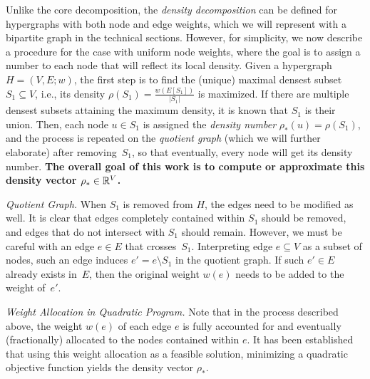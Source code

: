 Unlike the core decomposition, the \emph{density decomposition}
can be defined for hypergraphs with both node and edge weights,
which we will represent with a bipartite graph in the technical sections.
However, for simplicity, we now describe a procedure for the case with uniform node weights, where the goal is to assign a number to each node that will reflect its local density.
Given a hypergraph $H = (V, E; w)$, the first step
is to find the (unique) maximal densest subset $S_1 \subseteq V$,
i.e., its density $\rho(S_1) = \frac{w(E[S_1])}{|S_1|}$ is maximized.
If there are multiple densest subsets attaining the maximum density, it is known that $S_1$ is their union.
Then, each node $u \in S_1$ is assigned the \emph{density number}
$\rho_*(u) = \rho(S_1)$, and the process is repeated on
the \emph{quotient graph} (which we will further elaborate) after removing~$S_1$, so that
eventually, every node will get its density number.
\textbf{
The overall goal of this work is to compute or approximate this density
vector $\rho_* \in \mathbb{R}^V$.}




\noindent \emph{Quotient Graph.} When $S_1$ is removed 
from $H$, the edges need to be modified as well.
It is clear that edges completely contained within $S_1$
should be removed, and edges that do not intersect with $S_1$
should remain.  However, we must be careful with
an edge $e \in E$ that crosses~$S_1$.  Interpreting
edge $e \subseteq V$ as a subset of nodes,
such an edge induces $e' = e \setminus S_1$ in the quotient graph.
If such $e' \in E$ already exists in~$E$, then the original weight $w(e)$ needs to be added to the weight of~$e'$.

\noindent \emph{Weight Allocation in Quadratic Program.} 
Note that in the process described above, the weight $w(e)$ of each edge $e$ is fully accounted for and eventually (fractionally) allocated to the nodes contained within $e$. It has been established that using this weight allocation as a feasible solution, minimizing a quadratic objective function yields the density vector $\rho_*$.


